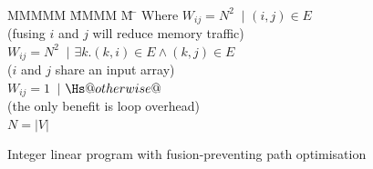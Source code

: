 \begin{figure}
\begin{tabbing}
\\[0.5ex]
MMMMM   \= MMMM \= M \= \kill
Where      \> $W_{ij} = N^2$ \> $~|$ \> $(i,j) \in E $         \\
           \> \> \> (fusing $i$ and $j$ will reduce memory traffic)         \\
           \> $W_{ij} = N^2$ \> $~|$ \> $\exists k. (k,i) \in E \wedge (k,j) \in E $     \\
           \> \> \> ($i$ and $j$ share an input array)                                         \\
           \> $W_{ij} = 1$   \> $~|$ \> $\Hs@otherwise@$                                                  \\
           \> \> \> (the only benefit is loop overhead)                                        
\\
           \> $N = |V|$
\end{tabbing}
\caption{Integer linear program with fusion-preventing path optimisation}
\label{fig:clustering:ilp-fpo}
\end{figure}

% 
